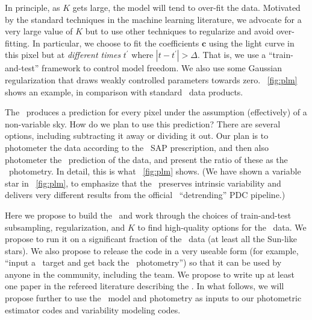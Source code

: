 \documentclass[letterpaper,12pt,preprint]{hack_aastex}
\newcommand{\bvec}[1]{{\ensuremath{{\boldsymbol{#1}}}}}
\begin{document}
In principle, as $K$ gets large, the model will tend to over-fit the data.
Motivated by the standard techniques in the machine learning literature, we
advocate for a very large value of $K$ but to use other techniques to regularize
and avoid over-fitting.
In particular, we choose to fit the coefficients $\bvec{c}$ using the light
curve in this pixel but at \emph{different times} $t^\prime$ where
$|t-t^\prime| > \Delta$.
That is, we use a ``train-and-test'' framework to control model freedom.
We also use some Gaussian regularization that draws weakly controlled parameters
towards zero.
\figurename~\ref{fig:plm} shows an example, in comparison with standard
\Kepler\ data products.


The \PLM\ produces a prediction for every pixel under the assumption
(effectively) of a non-variable sky.
How do we plan to use this prediction?
There are several options, including subtracting it away or dividing it out.
Our plan is to photometer the data according to the \Kepler\ SAP prescription,
and then also photometer the \PLM\ prediction of the data, and present the
ratio of these as the \PLM\ photometry.
In detail, this is what \figurename~\ref{fig:plm} shows.
(We have shown a variable star in \figurename~\ref{fig:plm}, to emphasize that
the \PLM\ preserves intrinsic variability and delivers very different results
from the official \Kepler\ ``detrending'' PDC pipeline.)

Here we propose to build the \PLM\ and work through the choices of
train-and-test subsampling, regularization, and $K$ to find high-quality
options for the \Kepler\ data.
We propose to run it on a significant fraction of the
\Kepler\ data (at least all the Sun-like stars).
We also propose to release the code in a very useable form (for example, ``input
a \Kepler\ target and get back the \PLM\ photometry'') so that it can be used
by anyone in the community, including the  team.
We propose to write up at least one paper in the refereed literature describing
the \PLM.
In what follows, we will propose further to use the \PLM\ model and photometry
as inputs to our photometric estimator codes and variability modeling codes.
\end{document}
